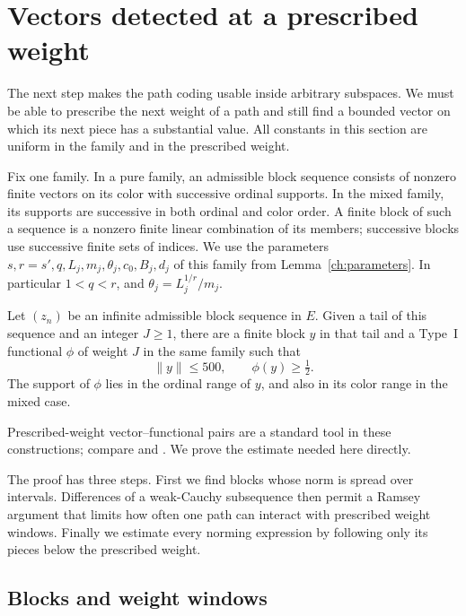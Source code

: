 \section{Vectors detected at a prescribed weight}\label{pair:section}

The next step makes the path coding usable inside arbitrary subspaces.  We
must be able to prescribe the next weight of a path and still find a bounded
vector on which its next piece has a substantial value.  All constants in
this section are uniform in the family and in the prescribed weight.

Fix one family.  In a pure family, an admissible block sequence consists of
nonzero finite vectors on its color with successive ordinal supports.  In
the mixed family, its supports are successive in both ordinal and color
order.  A finite block of such a sequence is a nonzero finite linear combination
of its members; successive blocks use successive finite sets of indices.  We use the parameters
$s,r=s',q,L_j,m_j,\theta_j,c_0,B_j,d_j$ of this family from
Lemma~\ref{ch:parameters}.  In particular $1<q<r$, and
$\theta_j=L_j^{1/r}/m_j$.

\begin{proposition}\label{pair:exact}
Let $(z_n)$ be an infinite admissible block sequence in $E$.  Given a tail
of this sequence and an integer $J\ge1$, there are a finite block $y$ in
that tail and a Type~I functional $\phi$ of weight $J$ in the same family
such that
\[
 \|y\|\le500,\qquad \phi(y)\ge\tfrac12.
\]
The support of $\phi$ lies in the ordinal range of $y$, and also in its
color range in the mixed case.
\end{proposition}

Prescribed-weight vector--functional pairs are a standard tool in these
constructions; compare \cite[Section~3]{ArgyrosLopezAbadTodorcevic2005}
and \cite[Section~1]{ArgyrosArvanitakisTolias2006}.
We prove the estimate needed here directly.

The proof has three steps.  First we find blocks whose norm is spread over
intervals.  Differences of a weak-Cauchy subsequence then permit a Ramsey
argument that limits how often one path can interact with prescribed weight
windows.  Finally we estimate every norming expression by following only
its pieces below the prescribed weight.

\subsection{Blocks and weight windows}

